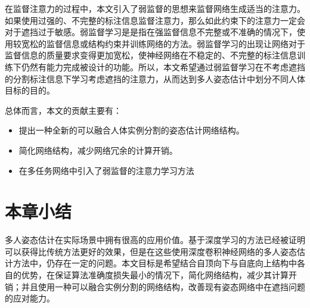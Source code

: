 在监督注意力的过程中，本文引入了弱监督的思想来监督网络生成适当的注意力。如果使用过强的、不完整的标注信息监督注意力，那么如此约束下的注意力一定会对于遮挡过于敏感。弱监督学习是是指在强监督信息不完整或不准确的情况下，使用较宽松的监督信息或结构约束并训练网络的方法\cite{10.1093/nsr/nwx106}。弱监督学习的出现让网络对于监督信息的质量要求变得更加宽松，使神经网络在不稳定的、不完整的标注信息训练下仍然有能力完成被设计的功能。所以，本文希望通过弱监督学习在不考虑遮挡的分割标注信息下学习考虑遮挡的注意力，从而达到多人姿态估计中划分不同人体目标的目的。

总体而言，本文的贡献主要有：
\begin{itemize}
	\item 提出一种全新的可以融合人体实例分割的姿态估计网络结构。
	\item 简化网络结构，减少网络冗余的计算开销。
	\item 在多任务网络中引入了弱监督的注意力学习方法
\end{itemize}

\section{本章小结}
\label{sec:introconclusion}
多人姿态估计在实际场景中拥有很高的应用价值。基于深度学习的方法已经被证明可以获得比传统方法更好的效果，但是在这些使用深度卷积神经网络的多人姿态估计方法中，仍存在一定的问题。本文目标是希望结合自顶向下与自底向上结构中各自的优势，在保证算法准确度损失最小的情况下，简化网络结构，减少其计算开销；并且使用一种可以融合实例分割的网络结构，改善现有姿态网络中在遮挡问题的应对能力。